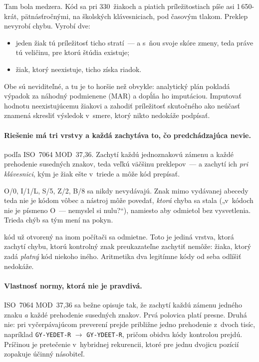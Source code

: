 Tam bola medzera. Kód sa pri 330~žiakoch a piatich príležitostiach píše asi
1\,650-krát, pätnásťročnými, na školských klávesniciach, pod časovým tlakom.
Preklep nevyrobí chybu. Vyrobí dve:

\begin{itemize}[nosep]
    \item jeden žiak tú príležitosť ticho stratí~--- a s~ňou svoje skóre zmeny,
          teda práve tú veličinu, pre ktorú štúdia existuje;
    \item žiak, ktorý neexistuje, ticho získa riadok.
\end{itemize}

Obe sú neviditeľné, a tu je to horšie než obvykle: analytický plán pokladá
výpadok za náhodný podmienene (MAR) a dopĺňa ho imputáciou. Imputovať hodnotu
neexistujúcemu žiakovi a zahodiť príležitosť skutočného ako neúčasť znamená
skresliť výsledok v~smere, ktorý nikto nedokáže podpísať.

\paragraph{Riešenie má tri vrstvy a každá zachytáva to, čo predchádzajúca nevie.}

\begin{description}[leftmargin=0.6cm, nosep]
    \item[\textbf{Kontrolný znak}] podľa ISO~7064 MOD~37,36. Zachytí každú
          jednoznakovú zámenu a každé prehodenie susedných znakov, teda veľkú
          väčšinu preklepov~--- a zachytí ich \emph{pri klávesnici}, kým je žiak
          ešte v~triede a môže kód prepísať.
    \item[\textbf{Abeceda bez zámenitelných znakov}] O/0, I/1/L, S/5, Z/2, B/8 sa
          nikdy nevydávajú. Znak mimo vydávanej abecedy teda nie je kódom vôbec a
          nástroj môže povedať, \emph{ktorá} chyba sa stala („v~kódoch nie je
          písmeno O~--- nemyslel si nulu?“), namiesto aby odmietol bez
          vysvetlenia. Trieda chýb sa tým mení na pokyn.
    \item[\textbf{Jeden kód, jedno sedenie}] kód už otvorený na inom počítači sa
          odmietne. Toto je jediná vrstva, ktorá zachytí chybu, ktorú kontrolný
          znak preukazateľne zachytiť nemôže: žiaka, ktorý zadá \emph{platný} kód
          niekoho iného. Aritmetika dva legitímne kódy od seba odlíšiť nedokáže.
\end{description}

\paragraph{Vlastnosť normy, ktorá nie je pravdivá.} ISO~7064 MOD~37,36 sa bežne
opisuje tak, že zachytí každú zámenu jedného znaku \emph{a} každé prehodenie
susedných znakov. Prvá polovica platí presne. Druhá nie: pri vyčerpávajúcom
preverení prejde približne jedno prehodenie z~dvoch tisíc, napríklad
\texttt{GY-YEDET-R} $\rightarrow$ \texttt{GY-YDEET-R}, pričom obidva kódy
kontrolou prejdú. Príčinou je pretečenie v~hybridnej rekurencii, ktoré pre jednu
dvojicu pozícií zopakuje účinný násobiteľ.

